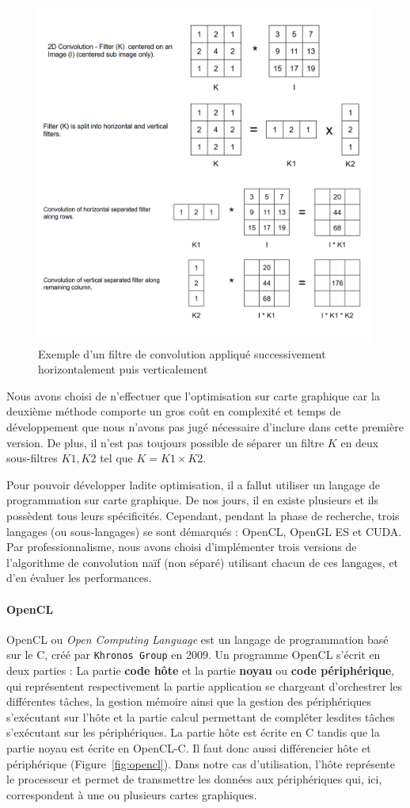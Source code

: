 \begin{figure}[H]
\centering
\includegraphics[width=0.7\linewidth]{images/separableconv}
\caption{Exemple d'un filtre de convolution appliqué successivement horizontalement puis verticalement}
\label{fig:conv:separable}
\end{figure}

Nous avons choisi de n'effectuer que l'optimisation sur carte graphique car la deuxième méthode comporte un gros coût en complexité et temps de développement que nous n'avons pas jugé nécessaire d'inclure dans cette première version. De plus, il n'est pas toujours possible de séparer un filtre $K$ en deux sous-filtres $K1, K2$ tel que $K = K1 \times K2$.

Pour pouvoir développer ladite optimisation, il a fallut utiliser un langage de programmation sur carte graphique. De nos jours, il en existe plusieurs et ils possèdent tous leurs spécificités. Cependant, pendant la phase de recherche, trois langages (ou sous-langages) se sont démarqués : OpenCL\cite{opencl}, OpenGL ES\cite{opengles} et CUDA\cite{cuda}. Par professionnalisme, nous avons choisi d'implémenter trois versions de l'algorithme de convolution naïf (non séparé) utilisant chacun de ces langages, et d'en évaluer les performances.

\paragraph{OpenCL} OpenCL ou \emph{Open Computing Language} est un langage de programmation basé sur le C, créé par \texttt{Khronos Group} en 2009.
Un programme OpenCL s'écrit en deux parties : La partie \textbf{code hôte} et la partie \textbf{noyau} ou \textbf{code périphérique}, qui représentent respectivement la partie application se chargeant d'orchestrer les différentes tâches, la gestion mémoire ainsi que la gestion des périphériques s'exécutant sur l'hôte et la partie calcul permettant de compléter lesdites tâches s'exécutant sur les périphériques. La partie hôte est écrite en C tandis que la partie noyau est écrite en OpenCL-C.
Il faut donc aussi différencier hôte et périphérique (Figure~\ref{fig:opencl}). Dans notre cas d'utilisation, l'hôte représente le processeur et permet de transmettre les données aux périphériques qui, ici, correspondent à une ou plusieurs cartes graphiques.

